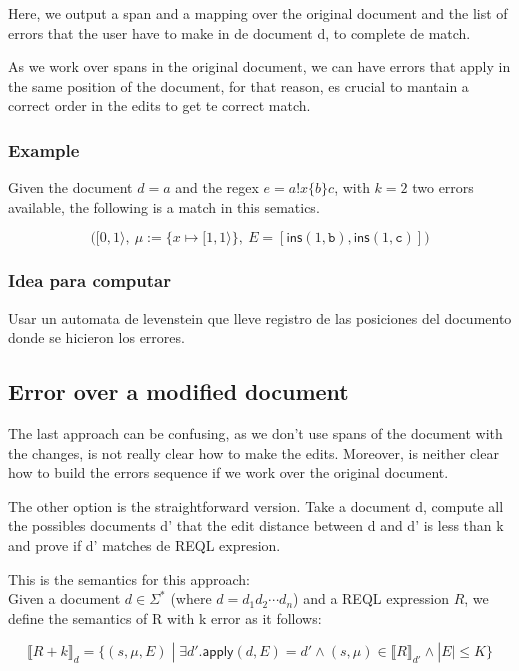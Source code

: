 \documentclass{article}
\begin{document}
Here, we output a span and a mapping over the original document and the list of errors that the user have to make in de document d, to complete de match.

As we work over spans in the original document, we can have errors that apply in the same position of the document, for that reason, es crucial to mantain a correct order in the edits to get te correct match.

\subsubsection{Example}


Given the document $d = a$ and the regex $e = a!x\{b\}c$, with $k = 2$ two errors available, the following is a match in this sematics.

\[
\Big([0,1\rangle,\ \mu := \{x \mapsto [1,1\rangle\},\ E = [\mathsf{ins}(1,\texttt{b}), \mathsf{ins}(1,\texttt{c})]\Big)
\]

\subsubsection{Idea para computar}

Usar un automata de levenstein que lleve registro de las posiciones del documento donde se hicieron los errores.


\subsection{Error over a modified document}

The last approach can be confusing, as we don't use spans of the document with the changes, is not really clear how to make the edits. Moreover, is neither clear how to build the errors sequence if we work over the original document.

The other option is the straightforward version. Take a document d, compute all the possibles documents d' that the edit distance between d and d' is less than k and prove if d' matches de REQL expresion.

This is the semantics for this approach: \\

Given a document $d \in \Sigma^*$ (where $d = d_1d_2\cdots d_n$) and a REQL expression $R$, we define the semantics of R with k error as it follows:


\[ \llbracket R + k \rrbracket_d = \{(s, \mu, E) \; | \; \exists d'. \mathsf{apply}(d, E) = d' \land (s, \mu) \in \llbracket R \rrbracket_{d'} \land | E | \leq K  \}\]
\end{document}
